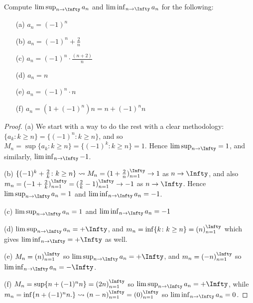 \documentclass[oneside]{amsart}
\theoremstyle{definition}
\begin{document}
\begin{tcolorbox}[colback=black!5!white,colframe=black!75!black,title= Exercise $4.3.$] Compute $\limsup_{n \to \Infty} a_n$ and $\liminf_{n \to \Infty} a_n$ for the following:
\begin{itemize}
	\item [(a)] $a_n = (-1)^n$
	\item [(b)] $a_n = (-1)^n + \frac{2}{n}$
	\item [(c)] $a_n = (-1)^n \cdot \frac{(n+2)}{n}$
	\item [(d)] $a_n = n$
	\item [(e)] $a_n = (-1)^n \cdot n$
	\item [(f)] $a_n = (1+(-1)^n)n =n+(-1)^n n$
\end{itemize}
\tcblower 
\begin{proof} (a) We start with a way to do the rest with a clear methodology: $ \{ a_k \colon k\geq n \} = \{(-1)^n \colon k \geq n \}$, and so $M_n = \sup \{a_k \colon k \geq n \} = \{ (-1)^k \colon k \geq n \} = 1$. Hence $\limsup_{n \to \Infty } = 1$, and similarly, $\liminf_{n \to \Infty } -1$.

(b) $\{ (-1)^k+ \frac{2}{k} \colon k \geq n \} \rightsquigarrow M_n = (1 + \frac{2}{n} )_{n=1}^\Infty  \to 1$ as $n \to \Infty$, and also $m_n = (-1+ \frac{2}{k} )_{n=1}^\Infty = (\frac{2}{k}-1)_{n=1}^\Infty \to -1$ as $n \to \Infty$. Hence $\limsup_{n \to \Infty}a_n = 1$ and $\liminf _{n \to \Infty} a_n = -1$.

(c) $\limsup_{n \to \Infty} a_n = 1$ and $\liminf_{n \to \Infty} a_n = -1$

(d) $\limsup_{ n \to \Infty} a_n = +\Infty$, and $m_n = \inf \{ k \colon k \geq n \} = (n)_{n=1}^\Infty$ which gives $\liminf_{n \to \Infty} = + \Infty$ as well.

(e) $ M_n = (n)_{n =1}^\Infty$ so $\limsup_{ n \to \Infty} a_n = + \Infty $, and $m_n = (-n)_{n=1}^\Infty$ so $\liminf_{ n \to \Infty} a_n = -\Infty$.

(f) $M_n = \sup \{n+(-1)^n n  \} = (2n)_{n=1}^\Infty$ so $\limsup_{ n \to \Infty} a_n = +\Infty$, while $m_n = \inf \{n+(-1)^n n. \} \rightsquigarrow (n- n)_{n=1}^\Infty = (0)_{n=1}^\Infty$ so $\liminf _{ n \to \Infty} a_n = 0$.
\end{proof}
\end{tcolorbox}
\end{document}
